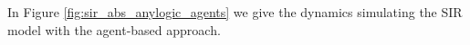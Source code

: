 In Figure \ref{fig:sir_abs_anylogic_agents} we give the dynamics simulating the SIR model with the agent-based approach.

%
	
\begin{figure}
\begin{center}


\end{center}
\end{figure}
